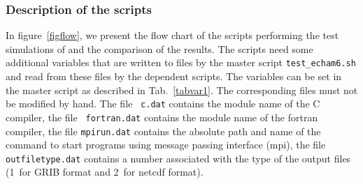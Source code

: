 \subsubsection{Description of the scripts}\label{sususecdescr}

In figure~\ref{figflow}, we present the flow chart of the scripts
performing the test simulations of \echam{} and the comparison of the
results. The scripts need some additional variables that are written
to files by the master script {\tt test\_echam6.sh} and read from these
files by the dependent scripts. The variables can be set in the master
script as described in Tab.~\ref{tabvar1}. The corresponding
files must not be modified by hand. The file {\tt
  c.dat} contains the module name of the C compiler, the file {\tt
  fortran.dat} contains the module name of the fortran compiler, the
file {\tt mpirun.dat} contains the absolute path and name of the
command to start programs using message passing interface (mpi), the
file {\tt outfiletype.dat} contains a number associated with the type
of the output files (1~for GRIB format and 2~for netcdf format).

